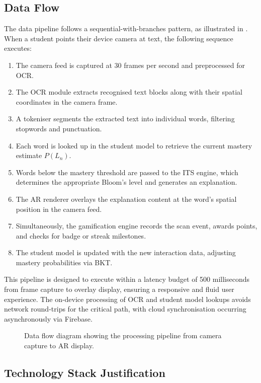 \subsection{Data Flow}
\label{subsec:data_flow}

The data pipeline follows a sequential-with-branches pattern, as illustrated in . When a student points their device camera at text, the following sequence executes:

\begin{enumerate}
    \item The camera feed is captured at 30 frames per second and preprocessed for OCR.
    \item The OCR module extracts recognised text blocks along with their spatial coordinates in the camera frame.
    \item A tokeniser segments the extracted text into individual words, filtering stopwords and punctuation.
    \item Each word is looked up in the student model to retrieve the current mastery estimate $P(L_n)$.
    \item Words below the mastery threshold are passed to the ITS engine, which determines the appropriate Bloom's level and generates an explanation.
    \item The AR renderer overlays the explanation content at the word's spatial position in the camera feed.
    \item Simultaneously, the gamification engine records the scan event, awards points, and checks for badge or streak milestones.
    \item The student model is updated with the new interaction data, adjusting mastery probabilities via BKT.
\end{enumerate}

This pipeline is designed to execute within a latency budget of 500 milliseconds from frame capture to overlay display, ensuring a responsive and fluid user experience. The on-device processing of OCR and student model lookups avoids network round-trips for the critical path, with cloud synchronisation occurring asynchronously via Firebase.

\begin{figure}[htbp]
    \centering
    
    \caption{Data flow diagram showing the processing pipeline from camera capture to AR display.}
    \label{fig:data_flow}
\end{figure}

\subsection{Technology Stack Justification}
\label{subsec:tech_stack}

